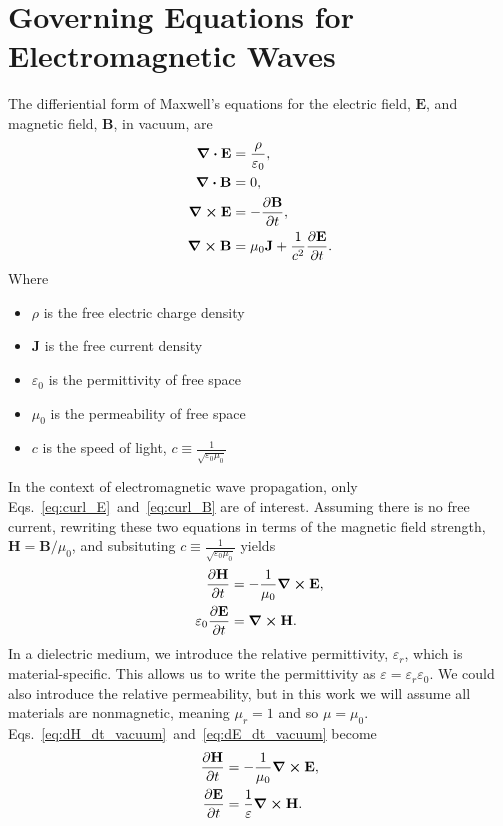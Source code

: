 \documentclass[12pt,twocolumn]{article}
\begin{document}
\section{Governing Equations for Electromagnetic Waves}
The differiential form of Maxwell's equations for the electric field, $\mathbf{E}$, and magnetic field, $\mathbf{B}$, in vacuum, are~\cite{Jackson99}
\begin{subequations}
\begin{align}
\div{\mathbf{E}} &= \frac{\rho}{\varepsilon_0}, \\
\div{\mathbf{B}} &= 0, \\
\label{eq:curl_E}\curl{\mathbf{E}}&= -\frac{\partial\mathbf{B}}{\partial t}, \\
\label{eq:curl_B}\curl{\mathbf{B}}&= \mu_0\mathbf{J}+\frac{1}{c^2}\frac{\partial\mathbf{E}}{\partial t}.
\end{align}
\end{subequations}
Where
\begin{itemize}
\item $\rho$ is the free electric charge density
\item $\mathbf{J}$ is the free current density
\item $\varepsilon_0$ is the permittivity of free space
\item $\mu_0$ is the permeability of free space
\item $c$ is the speed of light, $c\equiv\frac{1}{\sqrt{\varepsilon_0\mu_0}}$
\end{itemize}
In the context of electromagnetic wave propagation, only Eqs.~\ref{eq:curl_E}~and~\ref{eq:curl_B} are of interest. Assuming there is no free current, rewriting these two equations in terms of the magnetic field strength, $\mathbf{H}=\mathbf{B}/\mu_0$, and subsituting $c\equiv\frac{1}{\sqrt{\varepsilon_0\mu_0}}$ yields
\begin{subequations}
\begin{align}
\label{eq:dH_dt_vacuum}\frac{\partial\mathbf{H}}{\partial t} &= -\frac{1}{\mu_0}\curl{\mathbf{E}}, \\
\label{eq:dE_dt_vacuum}\varepsilon_0\frac{\partial\mathbf{E}}{\partial t} &= \curl{\mathbf{H}}.
\end{align}
\end{subequations}
In a dielectric medium, we introduce the relative permittivity, $\varepsilon_r$, which is material-specific. This allows us to write the permittivity as $\varepsilon=\varepsilon_r\varepsilon_0$. We could also introduce the relative permeability, but in this work we will assume all materials are nonmagnetic, meaning $\mu_r=1$ and so $\mu=\mu_0$. Eqs.~\ref{eq:dH_dt_vacuum}~and~\ref{eq:dE_dt_vacuum} become
\begin{subequations}
\begin{align}
\frac{\partial\mathbf{H}}{\partial t} &= -\frac{1}{\mu_0}\curl{\mathbf{E}}, \\
\frac{\partial\mathbf{E}}{\partial t} &= \frac{1}{\varepsilon}\curl{\mathbf{H}}.
\end{align}
\end{subequations}
\end{document}
